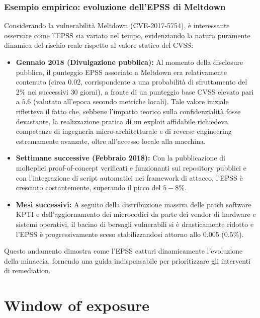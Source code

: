 \documentclass[../../main.tex]{subfiles}
\begin{document}
\subsubsection{Esempio empirico: evoluzione dell'EPSS di Meltdown}
Considerando la vulnerabilità Meltdown (CVE-2017-5754), è interessante osservare come l'EPSS sia variato nel tempo, evidenziando la natura puramente dinamica del rischio reale rispetto al valore statico del CVSS:
\begin{itemize}
    \item \textbf{Gennaio 2018 (Divulgazione pubblica):} Al momento della disclosure pubblica, il punteggio EPSS associato a Meltdown era relativamente contenuto (circa $0.02$, corrispondente a una probabilità di sfruttamento del $2\%$ nei successivi 30 giorni), a fronte di un punteggio base CVSS elevato pari a $5.6$ (valutato all'epoca secondo metriche locali). Tale valore iniziale rifletteva il fatto che, sebbene l'impatto teorico sulla confidenzialità fosse devastante, la realizzazione pratica di un exploit affidabile richiedeva competenze di ingegneria micro-architetturale e di reverse engineering estremamente avanzate, oltre all'accesso locale alla macchina.
    \item \textbf{Settimane successive (Febbraio 2018):} Con la pubblicazione di molteplici proof-of-concept verificati e funzionanti sui repository pubblici e con l'integrazione di script automatici nei framework di attacco, l'EPSS è cresciuto costantemente, superando il picco del $5-8\%$.
    \item \textbf{Mesi successivi:} A seguito della distribuzione massiva delle patch software KPTI e dell'aggiornamento dei microcodici da parte dei vendor di hardware e sistemi operativi, il bacino di bersagli vulnerabili si è drasticamente ridotto e l'EPSS è progressivamente sceso stabilizzandosi attorno allo $0.005$ ($0.5\%$).
\end{itemize}

Questo andamento dimostra come l'EPSS catturi dinamicamente l'evoluzione della minaccia, fornendo una guida indispensabile per prioritizzare gli interventi di remediation.

\section{Window of exposure}
\label{sec:window_of_exposure}
\end{document}
